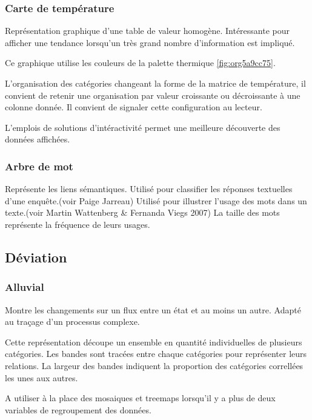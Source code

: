 \documentclass[a4paper,12pt]{article}
\begin{document}
\begin{multicols}{2}
\subsubsection{Carte de température}
\label{sec:org64dfec0}
Représentation graphique d'une table de valeur homogène. \autocite{sosulskiGraphics2019}
Intéressante pour afficher une tendance lorsqu'un très grand nombre d'information est impliqué.

Ce graphique utilise les couleurs de la palette thermique \ref{fig:org5a9cc75}.

L'organisation des catégories changeant la forme de la matrice de température, il convient de retenir une organisation par valeur croissante ou décroissante à une colonne donnée. Il convient de signaler cette configuration au lecteur. \autocite{wilkeVisualizingAmounts2019}

L'emplois de solutions d'intéractivité permet une meilleure découverte des données affichées.
\subsubsection{Arbre de mot}
\label{sec:org69854be}
Représente les liens sémantiques.
Utilisé pour classifier les réponses textuelles d'une enquête.(voir Paige Jarreau)
Utilisé pour illustrer l'usage des mots dans un texte.(voir Martin Wattenberg \& Fernanda Viegs 2007)
La taille des mots représente la fréquence de leurs usages. \autocite{jonathanschwabishQualitative2021}
\subsection{Déviation}
\label{sec:orgb0e72ae}
\subsubsection{Alluvial}
\label{sec:org7711e6d}

Montre les changements sur un flux entre un état et au moins un autre. Adapté au traçage d'un processus complexe. \autocite{alansmithLexiqueVisuel}

Cette représentation découpe un ensemble en quantité individuelles de plusieurs catégories. Les bandes sont tracées entre chaque catégories pour représenter leurs relations. La largeur des bandes indiquent la proportion des catégories correllées les unes aux autres. \autocite{wilkeVisualizingNestedProportions2019}

A utiliser à la place des mosaiques et treemaps lorsqu'il y a plus de deux variables de regroupement des données. \autocite{wilkeDirectoryVisualizations2019}

\end{multicols}
\end{document}
